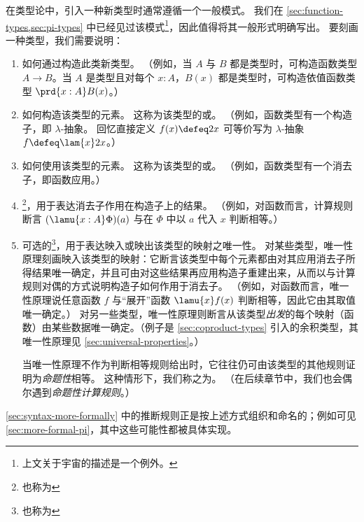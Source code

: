 \begin{rmk}\label{rmk:introducing-new-concepts}
  在类型论中，引入一种新类型时通常遵循一个一般模式。
  我们在 \cref{sec:function-types,sec:pi-types} 中已经见过该模式\footnote{上文关于宇宙的描述是一个例外。}，因此值得将其一般形式明确写出。
  要刻画一种类型，我们需要说明：
  \begin{enumerate}
  \item 如何通过构造此类新类型。
（例如，当 $A$ 与 $B$ 都是类型时，可构造函数类型 $A \to B$。当 $A$ 是类型且对每个 $x:A$，$B(x)$ 都是类型时，可构造依值函数类型 $\prd{x:A} B(x)$。）

  \item 如何构造该类型的元素。  
    这称为该类型的或。
    （例如，函数类型有一个构造子，即 $\lambda$-抽象。
    回忆直接定义 $f(x)\defeq 2x$ 可等价写为 $\lambda$-抽象 $f\defeq \lam{x} 2x$。）

  \item 如何使用该类型的元素。  
    这称为该类型的或。
    （例如，函数类型有一个消去子，即函数应用。）

  \item 
    \footnote{也称为}，用于表达消去子作用在构造子上的结果。
（例如，对函数而言，计算规则断言 $(\lamu{x:A}\Phi)(a)$ 与在 $\Phi$ 中以 $a$ 代入 $x$ 判断相等。）

  \item 
    可选的\footnote{也称为}，用于表达映入或映出该类型的映射之唯一性。  
对某些类型，唯一性原理刻画映入该类型的映射：它断言该类型中每个元素都由对其应用消去子所得结果唯一确定，并且可由对这些结果再应用构造子重建出来，从而以与计算规则对偶的方式说明构造子如何作用于消去子。
（例如，对函数而言，唯一性原理说任意函数 $f$ 与“展开”函数 $\lamu{x} f(x)$ 判断相等，因此它由其取值唯一确定。）
对另一些类型，唯一性原理则断言从该类型\emph{出发}的每个映射（函数）由某些数据唯一确定。（例子是 \cref{sec:coproduct-types} 引入的余积类型，其唯一性原理见 \cref{sec:universal-properties}。）  
    
    当唯一性原理不作为判断相等规则给出时，它往往仍可由该类型的其他规则证明为\emph{命题性}相等。
    这种情形下，我们称之为。
    （在后续章节中，我们也会偶尔遇到\emph{命题性计算规则}。）
  \end{enumerate}
 \cref{sec:syntax-more-formally} 中的推断规则正是按上述方式组织和命名的；例如可见 \cref{sec:more-formal-pi}，其中这些可能性都被具体实现。
\end{rmk}

